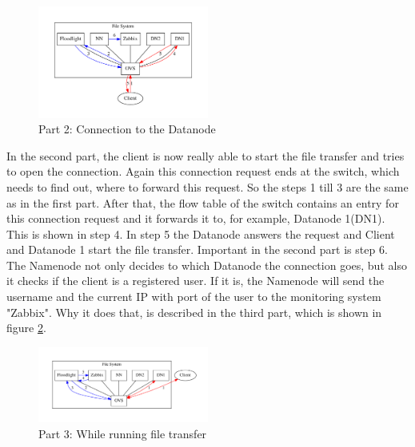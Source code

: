 \begin{figure}[ht]
\centering
\includegraphics[width=0.5\textwidth]{img/connectionToDatanode} 
\caption{Part 2: Connection to the Datanode}
\label{dn}
\end{figure}     

In the second part, the client is now really able to start the file transfer and tries to open the connection. Again this connection request ends at the switch, which needs to find out, where to forward this request. So the steps 1 till 3 are the same as in the first part. After that, the flow table of the switch contains an entry for this connection request and it forwards it to, for example, Datanode 1(DN1). This is shown in step 4. In step 5 the Datanode answers the request and Client and Datanode 1 start the file transfer. Important in the second part is step 6. The Namenode not only decides to which Datanode the connection goes, but also it checks if the client is a registered user. If it is, the Namenode will send the username and the current IP with port of the user to the monitoring system "Zabbix". Why it does that, is described in the third part, which is shown in figure \ref{wc}.    

\begin{figure}[ht]
\centering
\includegraphics[width=0.5\textwidth]{img/whileConnection} 
\caption{Part 3: While running file transfer}
\label{wc}
\end{figure}

